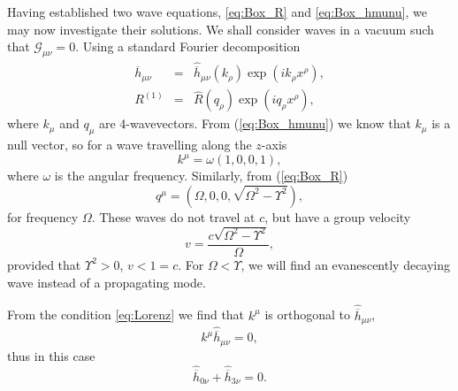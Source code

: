 \documentclass[aps,prd,reprint,showpacs]{revtex4-1}
\newcommand{\eqnref}[1]{(\ref{eq:#1})}
\begin{document}
Having established two wave equations, \eqref{eq:Box_R} and \eqref{eq:Box_hmunu}, we may now investigate their solutions. We shall consider waves in a vacuum such that $\mathcal{G}_{\mu\nu} = 0$. Using a standard Fourier decomposition
\begin{eqnarray}
\overline{h}_{\mu\nu} & = & \widehat{\overline{h}}_{\mu\nu}(k_\rho) \exp\left(ik_\rho x^\rho\right),\\
R^{(1)} & = & \widehat{R}(q_\rho) \exp\left(iq_\rho x^\rho\right),
\end{eqnarray}
where $k_\mu$ and $q_\mu$ are 4-wavevectors. From \eqnref{Box_hmunu} we know that $k_\mu$ is a null vector, so for a wave travelling along the $z$-axis
\begin{equation}
k^\mu = \omega(1, 0, 0, 1),
\end{equation}
where $\omega$ is the angular frequency. Similarly, from \eqnref{Box_R}
\begin{equation}
q^\mu = \left(\Omega, 0, 0, \sqrt{\Omega^2 - \Upsilon^2}\right),
\label{eq:Ricci_q}
\end{equation}
for frequency $\Omega$. These waves do not travel at $c$, but have a group velocity
\begin{equation}
v = \frac{c\sqrt{\Omega^2 - \Upsilon^2}}{\Omega},
\end{equation}
provided that $\Upsilon^2 > 0$, $v < 1 = c$. For $\Omega < \Upsilon$, we will find an evanescently decaying wave instead of a propagating mode.

From the condition \eqref{eq:Lorenz} we find that $k^\mu$ is orthogonal to $\widehat{\overline{h}}_{\mu\nu}$,
\begin{equation}
k^\mu\widehat{\overline{h}}_{\mu\nu} = 0,
\end{equation}
thus in this case
\begin{equation}
\widehat{\overline{h}}_{0\nu} + \widehat{\overline{h}}_{3\nu} = 0.
\label{eq:Transverse}
\end{equation}
\end{document}

